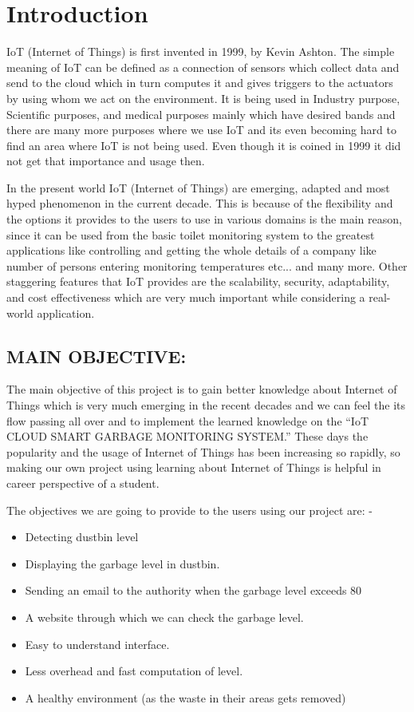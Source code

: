 \documentclass[12pt,letterpaper]{article}
\begin{document}
\newpage

\tableofcontents
\newpage

\typeout{}

\cleardoublepage 
\typeout{}

\cleardoublepage

\section{Introduction}
IoT (Internet of Things) is first invented in 1999, by Kevin Ashton. The simple meaning of IoT can be defined as a connection of sensors which collect data and send to the cloud which in turn computes it and gives triggers to the actuators by using whom we act on the environment. It is being used in Industry purpose, Scientific purposes, and medical purposes mainly which have desired bands and there are many more purposes where we use IoT and its even becoming hard to find an area where IoT is not being used. Even though it is coined in 1999 it did not get that importance and usage then.

In the present world IoT (Internet of Things) are emerging, adapted and most hyped phenomenon in the current decade. This is because of the flexibility and the options it provides to the users to use in various domains is the main reason, since it can be used from the basic toilet monitoring system to the greatest applications like controlling and getting the whole details of a company like number of persons entering monitoring temperatures etc... and many more. Other staggering features that IoT provides are the scalability, security, adaptability, and cost effectiveness which are very much important while considering a real-world application.
\subsection{MAIN OBJECTIVE: }
The main objective of this project is to gain better knowledge about Internet of Things which is very much emerging in the recent decades and we can feel the its flow passing all over and to implement the learned knowledge on the “IoT CLOUD SMART GARBAGE MONITORING SYSTEM.” These days the popularity and the usage of Internet of Things has been increasing so rapidly, so making our own project using learning about Internet of Things is helpful in career perspective of a student. 

The objectives we are going to provide to the users using our project are: - 
\begin{itemize}
    \item Detecting dustbin level
    \item Displaying the garbage level in dustbin.
    \item Sending an email to the authority when the garbage level exceeds 80%
    \item A website through which we can check the garbage level.
    \item Easy to understand interface.
    \item Less overhead and fast computation of level.
    \item A healthy environment (as the waste in their areas gets removed)
\end{itemize}
\end{document}
